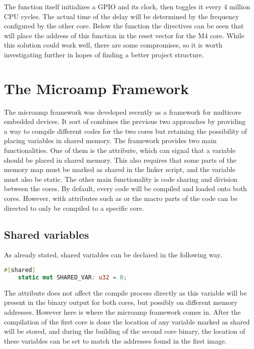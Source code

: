 The function itself initializes a GPIO and its clock, then toggles it every 4 million CPU cycles. The actual time of the delay will be determined by the frequency configured by the other core. Below the function the directives can be seen that will place the address of this function in the reset vector for the M4 core. While this solution could work well, there are some compromises, so it is worth investigating further in hopes of finding a better project structure.

\section{The Microamp Framework}

The microamp framework was developed recently as a framework for multicore embedded devices. It sort of combines the previous two approaches by providing a way to compile different codes for the two cores but retaining the possibility of placing variables in shared memory. The framework provides two main functionalities. One of them is the \mycode{#[shared]} attribute, which can signal that a variable should be placed in shared memory. This also requires that some parts of the memory map must be marked as shared in the linker script, and the variable must also be static. The other main functionality is code sharing and division between the cores. By default, every code will be compiled and loaded onto both cores. However, with attributes such as \mycode{#[cfg(core = "0")]} or the  macro parts of the code can be directed to only be compiled to a specific core.

\subsection{Shared variables}

As already stated, shared variables can be declared in the following way.

\begin{lstlisting}[language=Rust,frame=single,float=!ht,style=customrust,label={lst:shared-variable},caption={Shared Variable Example}]
    #[shared]
    static mut SHARED_VAR: u32 = 0;
\end{lstlisting}

The attribute does not affect the compile process directly as this variable will be present in the binary output for both cores, but possibly on different memory addresses. However here is where the microamp framework comes in. After the compilation of the first core is done the location of any variable marked as shared will be stored, and during the building of the second core binary, the location of these variables can be set to match the addresses found in the first image.

